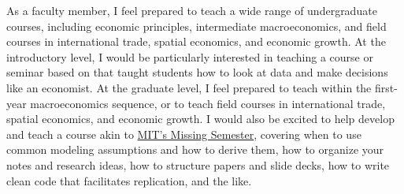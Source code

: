 \documentclass{jmstatement}
\begin{document}
As a faculty member, I feel prepared to teach a wide range of undergraduate courses,
including economic principles, intermediate macroeconomics, and field courses
in international trade, spatial economics, and economic growth.
At the introductory level, I would be particularly interested in teaching a course
or seminar based on \citet{Michael2016} that taught students how to look at data
and make decisions like an economist.
At the graduate level, I feel prepared to teach within the first-year macroeconomics
sequence, or to teach field courses in international trade, spatial economics,
and economic growth.
I would also be excited to help develop and teach a course akin to
\href{https://missing.csail.mit.edu/}{MIT's Missing Semester},
covering
when to use common modeling assumptions and how to derive them,
how to organize your notes and research ideas,
how to structure papers and slide decks,
how to write clean code that facilitates replication,
and the like.

\begingroup
\renewcommand{\section}[2]{}%


\endgroup
\end{document}
